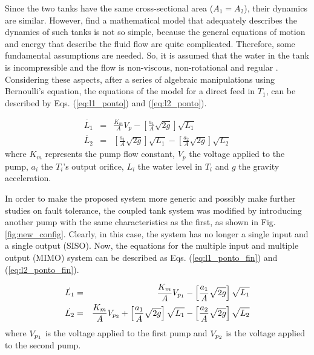 \documentclass[10pt,fleqn,a4paper]{article}
\begin{document}

Since the two tanks have the same cross-sectional area ($A_1 = A_2$), their
dynamics are similar. However, find a mathematical model that adequately
describes the dynamics of such tanks is not so simple, because the general
equations of motion and energy that describe the fluid flow are quite
complicated. Therefore, some fundamental assumptions are needed. So, it is
assumed that the water in the tank is incompressible and the flow is
non-viscous, non-rotational and regular \citep{dorf:2009}. Considering these
aspects, after a series of algebraic manipulations using Bernoulli's equation,
the equations of the model for a direct feed in $T_1$, can be described by Eqs.
(\ref{eq:l1_ponto}) and (\ref{eq:l2_ponto}).

\begin{eqnarray}
\dot{L_1} & = & \frac{K_m}{A}V_p -
                \left[\frac{a_1}{A}\sqrt{2g}\right]\sqrt{L_1}
                \label{eq:l1_ponto}\\
\dot{L_2} & = & \left[\frac{a_1}{A}\sqrt{2g}\right]\sqrt{L_1} -
                \left[\frac{a_2}{A}\sqrt{2g}\right]\sqrt{L_2}
                \label{eq:l2_ponto}
\end{eqnarray}
%
where $K_m$ represents the pump flow constant, $V_p$ the voltage applied to the
pump, $a_i$ the $T_i$'s output orifice, $L_i$ the water level in $T_i$ and $g$
the gravity acceleration.

In order to make the proposed system more generic and possibly make further
studies on fault tolerance, the coupled tank system was modified by introducing
another pump with the same characteristics as the first, as shown in Fig.
\ref{fig:new_config}. Clearly, in this case, the system has no longer a single
input and a single output (SISO). Now, the equations for the multiple input and
multiple output (MIMO) system can be described as Eqs. (\ref{eq:l1_ponto_fin})
and (\ref{eq:l2_ponto_fin}).

\begin{eqnarray}
\dot{L_1} & = & \frac{K_m}{A}V_{p_{\tiny 1}} -
                \left[\frac{a_1}{A}\sqrt{2g}\right]\sqrt{L_1}
                \label{eq:l1_ponto_fin}\\
\dot{L_2} & = & \frac{K_m}{A}V_{p_{\tiny 2}} +
                \left[\frac{a_1}{A}\sqrt{2g}\right]\sqrt{L_1} -
                \left[\frac{a_2}{A}\sqrt{2g}\right]\sqrt{L_2}
                \label{eq:l2_ponto_fin}
\end{eqnarray}
%
where $V_{p_{\tiny 1}}$ is the voltage applied to the first pump and
$V_{p_{\tiny 2}}$ is the voltage applied to the second pump.
\end{document}
